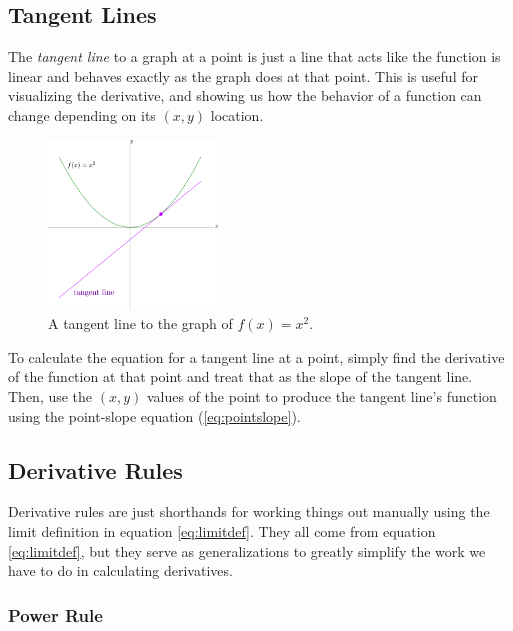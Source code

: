 \subsection{Tangent Lines}

The \emph{tangent line} to a graph at a point is just a line that acts like the function is linear and behaves exactly as the graph does at that point. This is useful for visualizing the derivative, and showing us how the behavior of a function can change depending on its $(x,y)$ location.

\begin{figure}[H]
  \begin{center}
    \includegraphics[width=0.4\textwidth]{continuous/derivatives/tangent.eps}
  \end{center}
  \caption{A tangent line to the graph of $f(x)=x^2$.}
\end{figure}

To calculate the equation for a tangent line at a point, simply find the
derivative of the function at that point and treat that as the slope of the
tangent line. Then, use the $(x, y)$ values of the point to produce the tangent line's function
using the point-slope equation (\eqref{eq:pointslope}).

\subsection{Derivative Rules}

Derivative rules are just shorthands for working things out manually using the
limit definition in equation \eqref{eq:limitdef}. They all come from equation \eqref{eq:limitdef}, but they serve as generalizations to greatly simplify the work we have to do in calculating derivatives.

\subsubsection{Power Rule}

